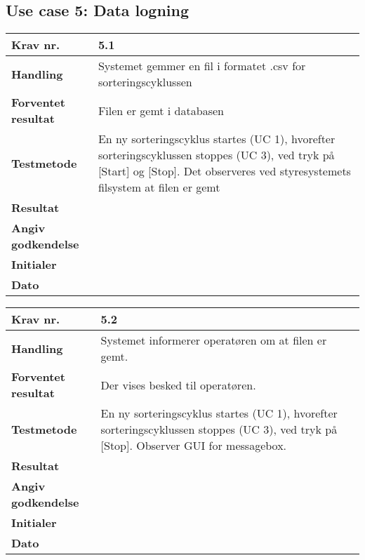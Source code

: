\newpage
  \subsection{Use case 5: Data logning}

	\begin{center}
		\begin{longtable}{ | m{4cm}| m{8.5cm}|} 
			\hline
			\textbf{Krav nr.} & 5.1 \\ 
			\hline
			\textbf{Handling} & Systemet gemmer en fil i formatet .csv for sorteringscyklussen  \\
			\hline
			\textbf{Forventet resultat} & Filen er gemt i databasen  \\
			\hline
			\textbf{Testmetode}  & En ny sorteringscyklus startes (UC 1), hvorefter sorteringscyklussen stoppes (UC 3), ved tryk på [Start] og [Stop]. Det observeres ved styresystemets filsystem at filen er gemt  \\
			\hline
			\textbf{Resultat}  &    \\
			\hline
			\textbf{Angiv godkendelse} &     \\
			\hline
			\textbf{Initialer} &     \\
			\hline
			\textbf{Dato} &    \\
			\hline
		\end{longtable}
	\end{center}			

	\begin{center}
		\begin{longtable}{ | m{4cm}| m{8.5cm}|} 
			\hline
			\textbf{Krav nr.} & 5.2 \\ 
			\hline
			\textbf{Handling} & Systemet informerer operatøren om at filen er gemt.  \\
			\hline
			\textbf{Forventet resultat} & Der vises besked til operatøren.  \\
			\hline
			\textbf{Testmetode}  & En ny sorteringscyklus startes (UC 1), hvorefter sorteringscyklussen stoppes (UC 3), ved tryk på [Stop]. Observer GUI for messagebox.  \\
			\hline
			\textbf{Resultat}  &    \\
			\hline
			\textbf{Angiv godkendelse} &     \\
			\hline
			\textbf{Initialer} &     \\
			\hline
			\textbf{Dato} &    \\
			\hline
		\end{longtable}
	\end{center}